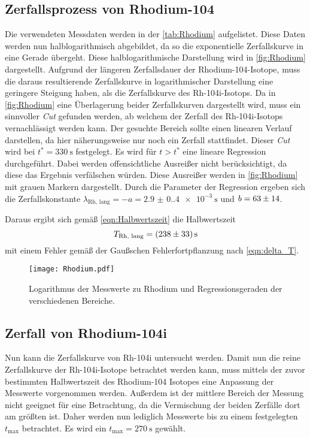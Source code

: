 \subsection{Zerfallsprozess von Rhodium-104}
\label{subsec:Rh104}
Die verwendeten Messdaten werden in der \autoref{tab:Rhodium} aufgelistet. Diese Daten werden nun halblogarithmisch abgebildet, da so die exponentielle Zerfallskurve in eine Gerade
übergeht. Diese halblogarithmische Darstellung wird in \autoref{fig:Rhodium} dargestellt. Aufgrund der längeren Zerfallsdauer der Rhodium-104-Isotope, muss die daraus 
resultierende Zerfallskurve in logarithmischer Darstellung eine geringere Steigung haben, als die Zerfallskurve des Rh-104i-Isotops. Da in \autoref{fig:Rhodium} eine Überlagerung
beider Zerfallskurven dargestellt wird, muss ein sinnvoller \textit{Cut} gefunden werden, ab welchem der Zerfall des Rh-104i-Isotops vernachlässigt werden kann. 
Der gesuchte Bereich sollte einen linearen Verlauf darstellen, da hier näherungsweise nur noch ein Zerfall stattfindet.
Dieser \textit{Cut} wird bei
$t^* = \qty{330}{\second}$ festgelegt. Es wird für $t > t^*$
eine lineare Regression durchgeführt. Dabei werden offensichtliche Ausreißer nicht berücksichtigt, da diese das Ergebnis verfälschen würden. Diese \glqq Ausreißer\grqq \;
werden in \autoref{fig:Rhodium} mit grauen Markern dargestellt.
Durch die Parameter der Regression ergeben sich die Zerfallskonstante $\lambda_\text{Rh, lang} = -a = \qty{2.9(0.4)e-3}{\second}$ und 
$b = \num{63 +- 14}$.

Daraus ergibt sich gemäß \autoref{eqn:Halbwertszeit} die Halbwertszeit 
\begin{equation*}
  T_\text{Rh, lang} = \qty{238 +- 33}{\second}
\end{equation*}
mit einem Fehler gemäß der Gaußschen Fehlerfortpflanzung nach \autoref{eqn:delta_T}.

\begin{figure}
  \centering
  \texttt{[image: Rhodium.pdf]}
  \caption{Logarithmus der Messwerte zu Rhodium und Regressionsgeraden der verschiedenen Bereiche.}
  \label{fig:Rhodium}
\end{figure}

\subsection{Zerfall von Rhodium-104i}
\label{subsec:Rh104i}

Nun kann die Zerfallskurve von Rh-104i untersucht werden. Damit nun die reine Zerfallskurve der Rh-104i-Isotope betrachtet werden kann, muss mittels der zuvor
bestimmten Halbwertszeit des Rhodium-104 Isotopes eine Anpassung der Messwerte vorgenommen werden. Außerdem ist der mittlere Bereich der Messung nicht geeignet für eine Betrachtung, da die 
Vermischung der beiden Zerfälle dort am größten ist. Daher werden nun lediglich Messwerte bis zu einem festgelegten $t_\text{max}$ betrachtet. Es wird ein 
$t_\text{max} = \qty{270}{\second}$ gewählt. 

